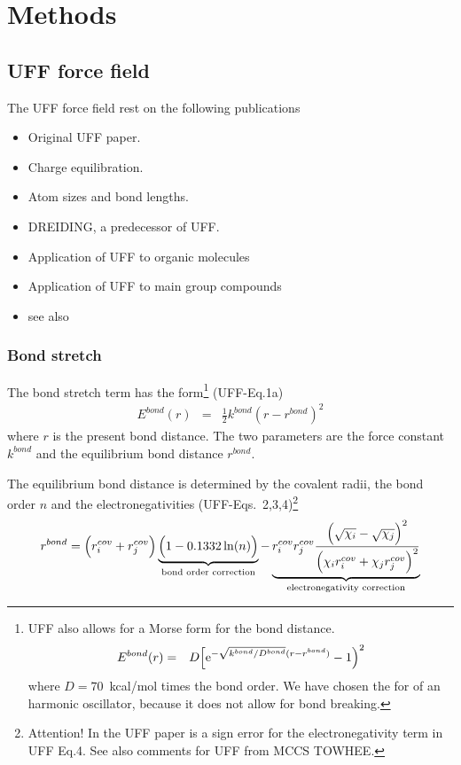 \documentclass[11pt,a4paper]{report}
\begin{document}
\chapter{Methods}
\section{UFF force field}
The UFF force field rest on the following publications
\begin{itemize}
\item Original UFF paper\cite{rappe92_jacs114_10024}.
\item Charge equilibration\cite{rappe91_jpc95_3358}.
\item Atom sizes and bond lengths\cite{okeefe92_jacs113_3226}.
\item DREIDING\cite{mayo90_jpc90_8897}, a predecessor of UFF.
\item Application of UFF to organic molecules\cite{casewit92_jacs114_10035}
\item Application of UFF to main group compounds\cite{casewit92_jacs114_11046}
\item see also\cite{addicoat14_jctc10_880}
\end{itemize}
\subsection{Bond stretch}
The bond stretch term has the form\footnote{UFF also allows for a
  Morse form for the bond distance.
\begin{eqnarray}
E^{bond}(r)&=&D\Bigl[\mathrm{e}^{-\sqrt{k^{bond}/D^{bond}}(r-r^{bond})}-1\Bigr)^2
\end{eqnarray}
where $D=70$~kcal/mol times the bond order.  We have chosen the for
of an harmonic oscillator, because it does not allow for bond
breaking.} (UFF-Eq.1a)
\begin{eqnarray}
E^{bond}(r)&=&\frac{1}{2} k^{bond}\left(r-r^{bond}\right)^2
\end{eqnarray}
where $r$ is the present bond distance. The two parameters are the
force constant $k^{bond}$ and the equilibrium bond distance
$r^{bond}$.

The equilibrium bond distance is determined by the covalent radii, the
bond order $n$ and the electronegativities
(UFF-Eqs.~2,3,4)\footnote{Attention! In the UFF paper is a sign error
  for the electronegativity term in UFF Eq.4. See also comments for
  UFF from MCCS TOWHEE.}
\begin{eqnarray}
r^{bond}=\Bigl(r^{cov}_i+r^{cov}_j\Bigr)
\underbrace{\Bigl(1-0.1332\ln(n)\Bigr)}_{\text{bond order correction}}
-
\underbrace{r^{cov}_ir^{cov}_j
\frac{\Bigl(\sqrt{\chi_i}-\sqrt{\chi_j}\Bigr)^2}
{\Bigl(\chi_ir^{cov}_i+\chi_jr^{cov}_j\Bigr)^2}}
_{\text{electronegativity correction}}
\end{eqnarray}
\end{document}
